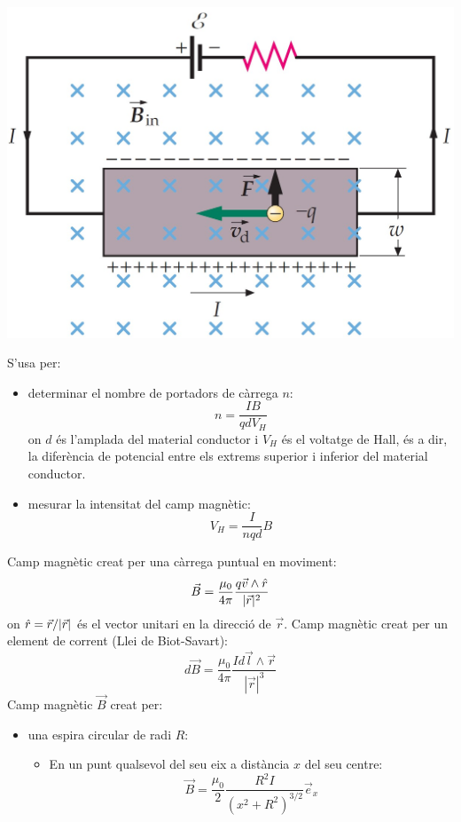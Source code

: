 \documentclass[class=article,10pt,crop=false]{standalone}
\begin{document}
\begin{multicols}{2}
\begin{minipage}{\linewidth}
\end{minipage}
\begin{minipage}{\linewidth}
    \centering
    \includegraphics[width=\linewidth]{Physics/1st/Electricity_and_magnetism/Images/hall-.jpg} 
\end{minipage}
S'usa per:
\begin{itemize}
    \item determinar el nombre de portadors de càrrega $n$: $$n=\frac{IB}{qdV_H}$$ {on $d$ és l'amplada del material conductor i $V_H$ és el voltatge de Hall, és a dir, la di\-fe\-rèn\-ci\-a de potencial entre els extrems superior i inferior del material conductor.}
    \item mesurar la intensitat del camp mag\-nè\-tic: $$V_H=\frac{I}{nqd}B$$
\end{itemize}
Camp magnètic creat per una càrrega puntual en moviment: $$\Vec{B}=\frac{\mu_0}{4\pi}\frac{q\Vec{v}\wedge\Hat{r}}{|\Vec{r}|^2}$$ {on $\Hat{r}=\Vec{r}/|\Vec{r}|$ és el vector unitari en la direcció de $\Vec{r}$.}\newline
Camp magnètic creat per un element de corrent (Llei de Biot-Savart): $$d\Vec{B}=\frac{\mu_0}{4\pi}\frac{Id\Vec{l}\wedge\Vec{r}}{|\Vec{r}|^3}$$
Camp magnètic $\Vec{B}$ creat per:
\begin{itemize}
    \item una espira circular de radi $R$:
    \begin{itemize}
        \item En un punt qualsevol del seu eix a distància $x$ del seu centre: $$\Vec{B}=\frac{\mu_0}{2}\frac{R^2I}{(x^2+R^2)^{3/2}}\Vec{e}_x$$

\end{itemize}
\end{itemize}
\end{multicols}
\end{document}
